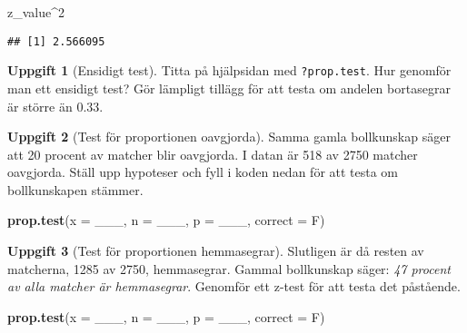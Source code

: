 \documentclass[
]{book}
\newenvironment{Shaded}{\begin{snugshade}}{\end{snugshade}}
\newcommand{\AttributeTok}[1]{\textcolor[rgb]{0.13,0.29,0.53}{#1}}
\newcommand{\DecValTok}[1]{\textcolor[rgb]{0.00,0.00,0.81}{#1}}
\newcommand{\FunctionTok}[1]{\textcolor[rgb]{0.13,0.29,0.53}{\textbf{#1}}}
\newcommand{\NormalTok}[1]{#1}
\newcommand{\SpecialCharTok}[1]{\textcolor[rgb]{0.81,0.36,0.00}{\textbf{#1}}}
\theoremstyle{definition}
\theoremstyle{definition}
\theoremstyle{definition}
\newtheorem{exercise}{Uppgift}[chapter]
\theoremstyle{definition}
\theoremstyle{remark}
\begin{document}
\begin{Shaded}
\begin{Highlighting}[]
\NormalTok{z\_value}\SpecialCharTok{\^{}}\DecValTok{2}
\end{Highlighting}
\end{Shaded}

\begin{verbatim}
## [1] 2.566095
\end{verbatim}

\begin{exercise}[Ensidigt test]
Titta på hjälpsidan med \texttt{?prop.test}. Hur genomför man ett ensidigt test? Gör lämpligt tillägg för att testa om andelen bortasegrar är större än 0.33.
\end{exercise}

\begin{exercise}[Test för proportionen oavgjorda]

Samma gamla bollkunskap säger att 20 procent av matcher blir oavgjorda. I datan är 518 av 2750 matcher oavgjorda. Ställ upp hypoteser och fyll i koden nedan för att testa om bollkunskapen stämmer.

\begin{Shaded}
\begin{Highlighting}[]
\FunctionTok{prop.test}\NormalTok{(}\AttributeTok{x =}\NormalTok{ \_\_\_, }\AttributeTok{n =}\NormalTok{ \_\_\_, }\AttributeTok{p =}\NormalTok{ \_\_\_, }\AttributeTok{correct =}\NormalTok{ F)}
\end{Highlighting}
\end{Shaded}

\end{exercise}

\begin{exercise}[Test för proportionen hemmasegrar]

Slutligen är då resten av matcherna, 1285 av 2750, hemmasegrar. Gammal bollkunskap säger: \emph{47 procent av alla matcher är hemmasegrar}. Genomför ett z-test för att testa det påstående.

\begin{Shaded}
\begin{Highlighting}[]
\FunctionTok{prop.test}\NormalTok{(}\AttributeTok{x =}\NormalTok{ \_\_\_, }\AttributeTok{n =}\NormalTok{ \_\_\_, }\AttributeTok{p =}\NormalTok{ \_\_\_, }\AttributeTok{correct =}\NormalTok{ F)}
\end{Highlighting}
\end{Shaded}

\end{exercise}
\end{document}
